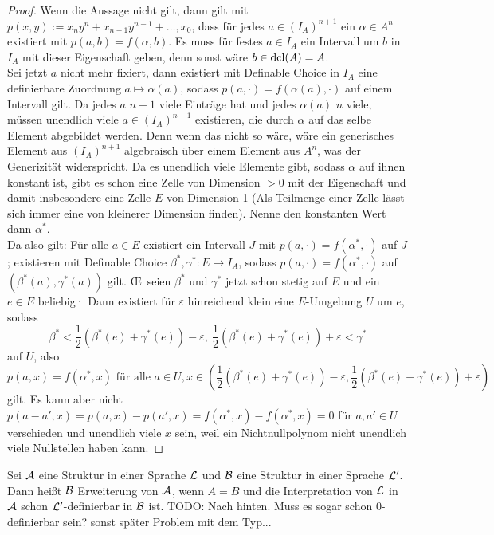 \begin{proof}
	Wenn die Aussage nicht gilt, dann gilt mit $p(x,y):=x_ny^n+x_{n-1}y^{n-1}+\dots,x_0$, dass für jedes $a\in (I_A)^{n+1}$ ein $\alpha\in A^n$ existiert mit $p(a,b)=f(\alpha,b)$. Es muss für festes $a\in I_A$ ein Intervall um $b$ in $I_A$ mit dieser Eigenschaft geben, denn sonst wäre $b\in\operatorname{dcl}(A)=A$.\\
	Sei jetzt $a$ nicht mehr fixiert, dann existiert mit Definable Choice in $I_A$ eine definierbare Zuordnung $a\mapsto\alpha(a)$, sodass $p(a,\cdot)=f(\alpha(a),\cdot)$ auf einem Intervall gilt. Da jedes $a$ $n+1$ viele Einträge hat und jedes $\alpha(a)$ $n$ viele, müssen unendlich viele $a\in (I_A)^{n+1}$ existieren, die durch $\alpha$ auf das selbe Element abgebildet werden. Denn wenn das nicht so wäre, wäre ein generisches Element aus $(I_A)^{n+1}$ algebraisch über einem Element aus $A^n$, was der Generizität widerspricht. Da es unendlich viele Elemente gibt, sodass $\alpha$ auf ihnen konstant ist, gibt es schon eine Zelle von Dimension $>0$ mit der Eigenschaft und damit insbesondere eine Zelle $E$ von Dimension 1 (Als Teilmenge einer Zelle lässt sich immer eine von kleinerer Dimension finden). Nenne den konstanten Wert dann $\alpha^*$.\\
	Da also gilt: Für alle $a\in E$ existiert ein Intervall $J$ mit $p(a,\cdot)=f(\alpha^*,\cdot)$ auf $J$; existieren mit Definable Choice $\beta^*,\gamma^*:E\rightarrow I_A$, sodass $p(a,\cdot)=f(\alpha^*,\cdot)$ auf $(\beta^*(a),\gamma^*(a))$ gilt. \OE\ seien $\beta^*$ und $\gamma^*$ jetzt schon stetig auf $E$ und ein $e\in E$ beliebig· Dann existiert für $\varepsilon$ hinreichend klein eine $E$-Umgebung $U$ um $e$, sodass $$\beta^*<\frac{1}{2}(\beta^*(e)+\gamma^*(e))-\varepsilon,\ \frac{1}{2}(\beta^*(e)+\gamma^*(e))+\varepsilon<\gamma^*$$ auf $U$, also $$p(a,x)=f(\alpha^*,x)\text{ für alle }a\in U,x\in(\frac{1}{2}(\beta^*(e)+\gamma^*(e))-\varepsilon,\frac{1}{2}(\beta^*(e)+\gamma^*(e))+\varepsilon)$$ gilt. Es kann aber nicht $p(a-a',x)=p(a,x)-p(a',x)=f(\alpha^*,x)-f(\alpha^*,x)=0$ für $a,a'\in U$ verschieden und unendlich viele $x$ sein, weil ein Nichtnullpolynom nicht unendlich viele Nullstellen haben kann.
\end{proof}

\newpage
\begin{definition}
	Sei $\mathcal{A}$ eine Struktur in einer Sprache $\mathcal{L}$ und $\mathcal{B}$ eine Struktur in einer Sprache $\mathcal{L}'$. Dann heißt $\mathcal{B}$ Erweiterung von $\mathcal{A}$, wenn $A=B$ und die Interpretation von $\mathcal{L}$ in $\mathcal{A}$ schon $\mathcal{L}'$-definierbar in $\mathcal{B}$ ist. TODO: Nach hinten. Muss es sogar schon 0-definierbar sein? sonst später Problem mit dem Typ...
\end{definition}

